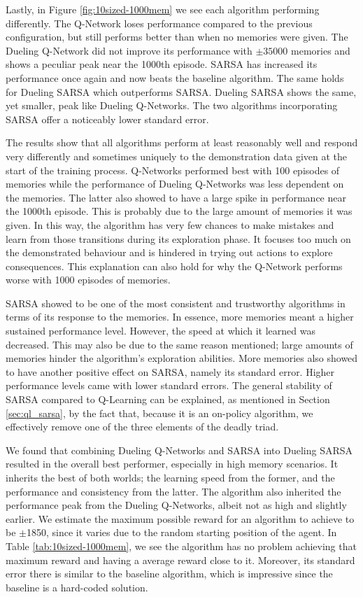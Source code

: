 Lastly, in Figure \ref{fig:10sized-1000mem} we see each algorithm performing differently. The Q-Network loses performance compared to the previous configuration, but still performs better than when no memories were given. The Dueling Q-Network did not improve its performance with $\pm 35000$ memories and shows a peculiar peak near the 1000th episode. SARSA has increased its performance once again and now beats the baseline algorithm. The same holds for Dueling SARSA which outperforms SARSA. Dueling SARSA shows the same, yet smaller, peak like Dueling Q-Networks. The two algorithms incorporating SARSA offer a noticeably lower standard error.

The results show that all algorithms perform at least reasonably well and respond very differently and sometimes uniquely to the demonstration data given at the start of the training process. Q-Networks performed best with 100 episodes of memories while the performance of Dueling Q-Networks was less dependent on the memories. The latter also showed to have a large spike in performance near the 1000th episode. This is probably due to the large amount of memories it was given. In this way, the algorithm has very few chances to make mistakes and learn from those transitions during its exploration phase. It focuses too much on the demonstrated behaviour and is hindered in trying out actions to explore consequences. This explanation can also hold for why the Q-Network performs worse with 1000 episodes of memories.

SARSA showed to be one of the most consistent and trustworthy algorithms in terms of its response to the memories. In essence, more memories meant a higher sustained performance level. However, the speed at which it learned was decreased. This may also be due to the same reason mentioned; large amounts of memories hinder the algorithm's exploration abilities. More memories also showed to have another positive effect on SARSA, namely its standard error. Higher performance levels came with lower standard errors. The general stability of SARSA compared to Q-Learning can be explained, as mentioned in Section \ref{sec:ql_sarsa}, by the fact that, because it is an on-policy algorithm, we effectively remove one of the three elements of the deadly triad. 

We found that combining Dueling Q-Networks and SARSA into Dueling SARSA resulted in the overall best performer, especially in high memory scenarios. It inherits the best of both worlds; the learning speed from the former, and the performance and consistency from the latter. The algorithm also inherited the performance peak from the Dueling Q-Networks, albeit not as high and slightly earlier. We estimate the maximum possible reward for an algorithm to achieve to be $\pm$1850, since it varies due to the random starting position of the agent. In Table \ref{tab:10sized-1000mem}, we see the algorithm has no problem achieving that maximum reward and having a average reward close to it. Moreover, its standard error there is similar to the baseline algorithm, which is impressive since the baseline is a hard-coded solution.

